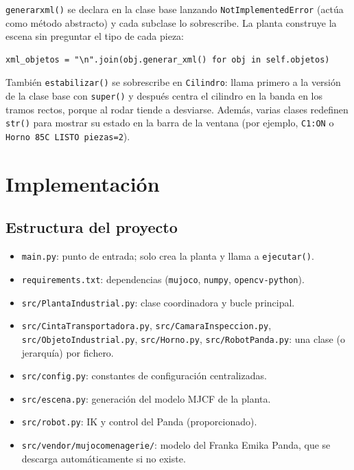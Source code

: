 \documentclass[12pt,a4paper]{article}
\renewcommand{\_}{\guionbajo\allowbreak}
\begin{document}
\texttt{generar\_xml()} se declara en la clase base lanzando
\texttt{NotImplementedError} (actúa como método abstracto) y cada subclase lo
sobrescribe. La planta construye la escena sin preguntar el tipo de cada pieza:

\begin{lstlisting}[caption={Uso polimórfico de \texttt{generar\_xml()}.}]
xml_objetos = "\n".join(obj.generar_xml() for obj in self.objetos)
\end{lstlisting}

También \texttt{estabilizar()} se sobrescribe en \texttt{Cilindro}: llama primero a la
versión de la clase base con \texttt{super()} y después centra el cilindro en la banda en
los tramos rectos, porque al rodar tiende a desviarse. Además, varias clases redefinen
\texttt{\_\_str\_\_()} para mostrar su estado en la barra de la ventana (por ejemplo,
\texttt{C1:ON} o \texttt{Horno 85C LISTO piezas=2}).

\clearpage
\section{Implementación}

\subsection{Estructura del proyecto}

\begin{itemize}
    \item \texttt{main.py}: punto de entrada; solo crea la planta y llama a
          \texttt{ejecutar()}.
    \item \texttt{requirements.txt}: dependencias (\texttt{mujoco}, \texttt{numpy},
          \texttt{opencv-python}).
    \item \texttt{src/PlantaIndustrial.py}: clase coordinadora y bucle principal.
    \item \texttt{src/CintaTransportadora.py}, \texttt{src/CamaraInspeccion.py},
          \texttt{src/ObjetoIndustrial.py}, \texttt{src/Horno.py},
          \texttt{src/RobotPanda.py}: una clase (o jerarquía) por fichero.
    \item \texttt{src/config.py}: constantes de configuración centralizadas.
    \item \texttt{src/escena.py}: generación del modelo MJCF de la planta.
    \item \texttt{src/robot.py}: IK y control del Panda (proporcionado).
    \item \texttt{src/vendor/mujoco\_menagerie/}: modelo del Franka Emika Panda, que se
          descarga automáticamente si no existe.
\end{itemize}
\end{document}
